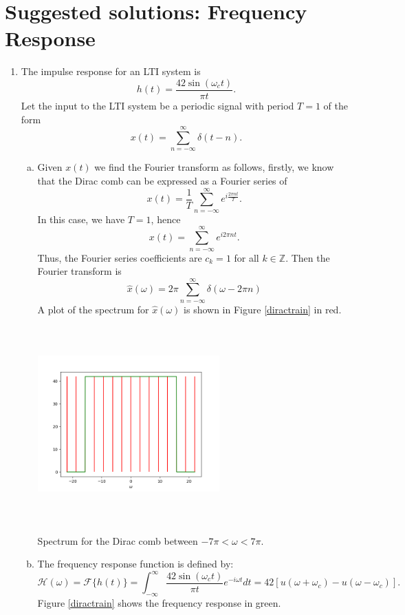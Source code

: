 \newpage
\section{Suggested solutions: Frequency Response}

\begin{enumerate}
\item The impulse response for an LTI system is 
$$h(t)=\frac{42\sin(\omega_{c}t)}{\pi t}.$$
Let the input to the LTI system be a periodic signal with period $T=1$ of the form
$$x(t)=\sum_{n=-\infty}^{\infty}\delta(t-n).$$

\begin{enumerate}[a)]
\item Given $x(t)$ we find the Fourier transform as follows, firstly, we know that the Dirac comb can be expressed as a Fourier series of 
$$x(t)=\frac{1}{T}\sum_{n=-\infty}^{\infty}e^{i\frac{2\pi nt}{T}}.$$
In this case, we have $T=1$, hence
$$x(t)=\sum_{n=-\infty}^{\infty}e^{i2\pi nt}.$$
Thus, the Fourier series coefficients are $c_{k}=1$ for all $k\in\mathbb{Z}$. Then the Fourier transform is
$$\hat{x}(\omega)=2\pi\sum_{n=-\infty}^{\infty}\delta(\omega-2\pi n)$$
A plot of the spectrum for $\hat{x}(\omega)$ is shown in Figure \ref{diractrain} in red.

\begin{marginfigure}[1cm]
    \includegraphics[height=7.5cm,width=7.0cm]{ch10/figures/diractrain.png}
    \caption{Spectrum for the Dirac comb between $-7\pi<\omega<7\pi$.}
    \label{diractrain}
\end{marginfigure}

\item The frequency response function is defined by:
$$\mathcal{H}(\omega)=\mathcal{F}\{h(t)\}=\int_{-\infty}^{\infty}\frac{42\sin(\omega_{c}t)}{\pi t}e^{-i\omega t}dt=42[u(\omega+\omega_{c})-u(\omega-\omega_{c})].$$
Figure \ref{diractrain} shows the frequency response in green.



\end{enumerate}
\end{enumerate}

